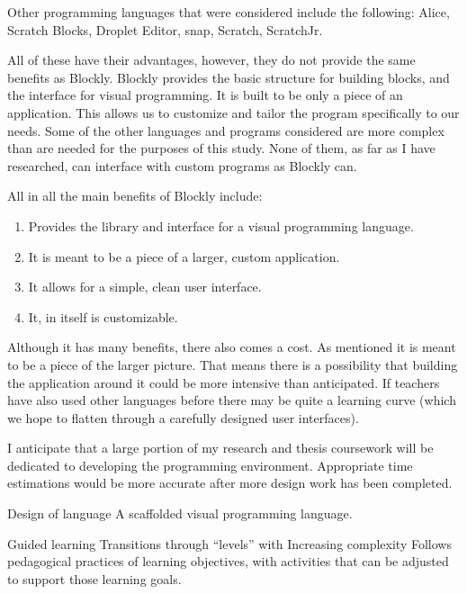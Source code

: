 Other programming languages that were considered include the following: Alice, Scratch Blocks, Droplet Editor, snap, Scratch, ScratchJr.

All of these have their advantages, however, they do not provide the same benefits as Blockly. Blockly provides the basic structure for building blocks, and the interface for visual programming. It is built to be only a piece of an application. This allows us to customize and tailor the program specifically to our needs. Some of the other languages and programs considered are more complex than are needed for the purposes of this study. None of them, as far as I have researched, can interface with custom programs as Blockly can.

All in all the main benefits of Blockly include: 
\begin{enumerate}
	\item Provides the library and interface for a visual programming language.
	\item It is meant to be a piece of a larger, custom application.
	\item It allows for a simple, clean user interface.
	\item It, in itself is customizable.
\end{enumerate}

Although it has many benefits, there also comes a cost. As mentioned it is meant to be a piece of the larger picture. That means there is a possibility that building the application around it could be more intensive than anticipated. If teachers have also used other languages before there may be quite a learning curve (which we hope to flatten through a carefully designed user interfaces). 

I anticipate that a large portion of my research and thesis coursework will be dedicated to developing the programming environment. Appropriate time estimations would be more accurate after more design work has been completed. 


Design of language
A scaffolded visual programming language.

Guided learning
Transitions through “levels” with Increasing complexity
Follows pedagogical practices of learning objectives,  with activities that can be adjusted to support those learning goals.

